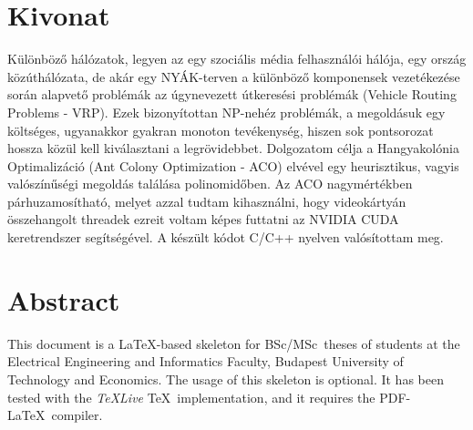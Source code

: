\setcounter{page}{1}

\selecthungarian

\chapter*{Kivonat}

Különböző hálózatok, legyen az egy szociális média felhasználói hálója, egy ország közúthálózata, de akár egy NYÁK-terven a különböző komponensek vezetékezése során alapvető problémák az úgynevezett útkeresési problémák (Vehicle Routing Problems - VRP). Ezek bizonyítottan NP-nehéz problémák, a megoldásuk egy költséges, ugyanakkor gyakran monoton tevékenység, hiszen sok pontsorozat hossza közül kell kiválasztani a legrövidebbet. Dolgozatom célja a Hangyakolónia Optimalizáció (Ant Colony Optimization - ACO) elvével egy heurisztikus, vagyis valószínűségi megoldás találása polinomidőben. Az ACO nagymértékben párhuzamosítható, melyet azzal tudtam kihasználni, hogy videokártyán összehangolt threadek ezreit voltam képes futtatni az NVIDIA CUDA keretrendszer segítségével. A készült kódot C/C++ nyelven valósítottam meg.



\vfill
\selectenglish


\chapter*{Abstract}

This document is a \LaTeX-based skeleton for BSc/MSc~theses of students at the Electrical Engineering and Informatics Faculty, Budapest University of Technology and Economics. The usage of this skeleton is optional. It has been tested with the \emph{TeXLive} \TeX~implementation, and it requires the PDF-\LaTeX~compiler.


\vfill
\selectthesislanguage

\setcounter{romanPage}{\value{page}}
